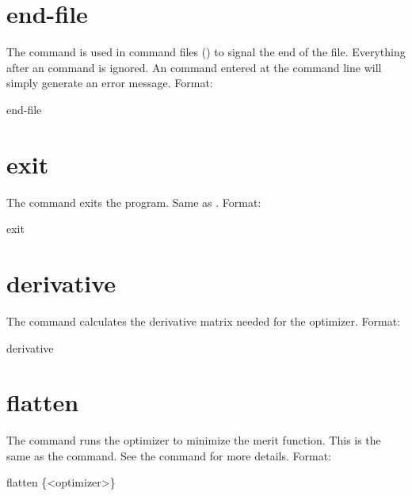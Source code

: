 \section{end-file} \label{s:end.file}

The  command is used in command files
() to signal the end of the file. Everything
after an  command is ignored. An  command
entered at the command line will simply generate an error message.
Format:
\begin{example}
  end-file
\end{example}

\section{exit}
\label{s:exit}

The  command exits the program. Same as .  Format:
\begin{example}
  exit
\end{example}

\section{derivative}
\label{s:deriv}

The  command calculates the  derivative
matrix needed for the  optimizer.
Format:
\begin{example}
  derivative
\end{example}

\section{flatten}
\label{s:flatten}

The  command runs the optimizer to minimize the merit
function. This is the same as the  command. 
See the  command for more details.  Format:
\begin{example}
  flatten \{<optimizer>\}
\end{example}

